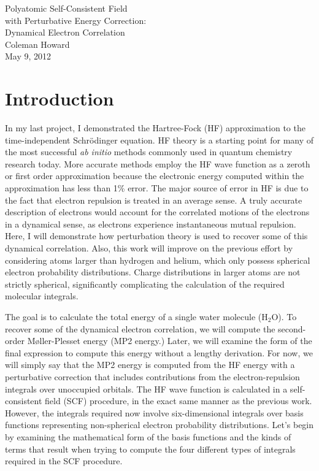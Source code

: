 \documentclass[12pt]{article}
\begin{document}
\begin{center}
{\huge Polyatomic Self-Consistent Field \\ with Perturbative Energy Correction: \\ 
\vspace{0.2cm}Dynamical Electron Correlation} \\
\vspace{2in}
{\large Coleman Howard \\
May 9, 2012 \\
\vspace{1cm}
}
\end{center}
\thispagestyle{empty} \phantom{.}
\newpage
\setcounter{page}{1}
\section{Introduction}
In my last project, I demonstrated the Hartree-Fock (HF) approximation to the time-independent
Schr\"{o}dinger equation. HF theory is a starting point for many of the most successful
\emph {ab initio} methods commonly used in quantum chemistry research today.
More accurate methods employ the HF wave function as a zeroth or first order
approximation because the electronic energy computed within the approximation
has less than 1\% error. The major source of error in HF is due to the fact that electron
repulsion is treated in an average sense. A truly accurate description of electrons would
account for the correlated motions of the electrons in a dynamical sense, as
electrons experience instantaneous mutual repulsion. Here, I will demonstrate
how perturbation theory is used to recover some of this dynamical correlation.
Also, this work will improve on the previous effort by considering atoms larger than 
hydrogen and helium, which only possess spherical electron probability distributions.
Charge distributions in larger atoms are not strictly spherical, significantly 
complicating the calculation of the required molecular integrals.

The goal is to calculate the total energy of a single water molecule (H$_2$O).
To recover some of the dynamical electron correlation, we will compute the second-order
M{\o}ller-Plesset energy (MP2 energy.) Later, we will examine the form of the final expression
to compute this energy without a lengthy derivation. For now, we will simply say that
the MP2 energy is computed from the HF energy with a perturbative correction that 
includes contributions from the electron-repulsion integrals over unoccupied orbitals.
The HF wave function is calculated in a self-consistent field (SCF) procedure, in
the exact same manner as the previous work. However, the integrals required now involve
six-dimensional integrals over basis functions representing non-spherical electron
probability distributions. Let's begin by examining the mathematical form of the basis functions
and the kinds of terms that result when trying to compute the four different types of
integrals required in the SCF procedure.
\end{document}
